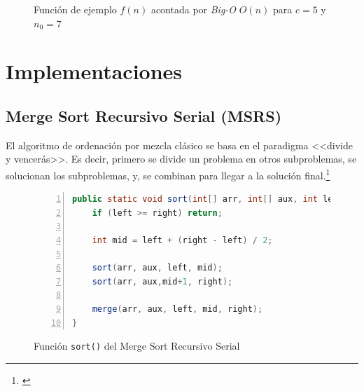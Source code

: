 \documentclass[titlepage]{article}
\begin{document}
\begin{figure}[h]
	\captionsetup{justification=centering}
	\centering
	
	\caption{Función de ejemplo \(f(n)\) acontada por \textit{Big-O} \(O(n)\) para \(c=5\) y \(n_0=7\)}
	\label{fig:bigO}
\end{figure}

\newpage
\section{Implementaciones} %

\subsection{Merge Sort Recursivo Serial (MSRS)} %
El algoritmo de ordenación por mezcla clásico se basa en el paradigma <<divide y vencerás>>. Es decir, primero se divide un problema en otros subproblemas, se solucionan los subproblemas, y, se combinan para llegar a la solución
final.\footnote{\cite{Sedgewick2003-cd}}

\begin{figure}[h]
    \begin{lstlisting}[language=java, frame=single, numbers=left]
public static void sort(int[] arr, int[] aux, int left, int right) {
	if (left >= right) return;
	
	int mid = left + (right - left) / 2;
	
	sort(arr, aux, left, mid);
	sort(arr, aux,mid+1, right);
	
	merge(arr, aux, left, mid, right);
}
    \end{lstlisting}
    \caption{Función \lstinline{sort()} del Merge Sort Recursivo Serial}
    \label{fig:MSRS_sort()}
\end{figure}
\end{document}
